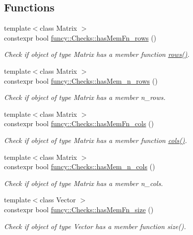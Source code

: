 \subsection*{Functions}
\begin{DoxyCompactItemize}
\item 
{\footnotesize template$<$class Matrix $>$ }\\constexpr bool \hyperlink{group__ConceptCheck_gab1d22f4faad380ccd489734763c5f39c}{funcy\-::\-Checks\-::has\-Mem\-Fn\-\_\-rows} ()
\begin{DoxyCompactList}\small\item\em Check if object of type Matrix has a member function \hyperlink{namespacefuncy_1_1LinearAlgebra_aea4d8c30f47543a340dd7d1efda08b6d}{rows()}. \end{DoxyCompactList}\item 
{\footnotesize template$<$class Matrix $>$ }\\constexpr bool \hyperlink{group__ConceptCheck_gaaa8a18550989f64d04281c686b0d5ebd}{funcy\-::\-Checks\-::has\-Mem\-\_\-n\-\_\-rows} ()
\begin{DoxyCompactList}\small\item\em Check if object of type Matrix has a member n\-\_\-rows. \end{DoxyCompactList}\item 
{\footnotesize template$<$class Matrix $>$ }\\constexpr bool \hyperlink{group__ConceptCheck_gaba617e734e07fb6c0ef1c519149d9381}{funcy\-::\-Checks\-::has\-Mem\-Fn\-\_\-cols} ()
\begin{DoxyCompactList}\small\item\em Check if object of type Matrix has a member function \hyperlink{namespacefuncy_1_1LinearAlgebra_adee762dc2457194e15c0a5e678babcb2}{cols()}. \end{DoxyCompactList}\item 
{\footnotesize template$<$class Matrix $>$ }\\constexpr bool \hyperlink{group__ConceptCheck_ga196a98efffbe30b11cce354aee5a5b0b}{funcy\-::\-Checks\-::has\-Mem\-\_\-n\-\_\-cols} ()
\begin{DoxyCompactList}\small\item\em Check if object of type Matrix has a member n\-\_\-cols. \end{DoxyCompactList}\item 
{\footnotesize template$<$class Vector $>$ }\\constexpr bool \hyperlink{group__ConceptCheck_ga48c01f7921e57edba22ceb78efabd580}{funcy\-::\-Checks\-::has\-Mem\-Fn\-\_\-size} ()
\begin{DoxyCompactList}\small\item\em Check if object of type Vector has a member function size(). \end{DoxyCompactList}\end{DoxyCompactItemize}
